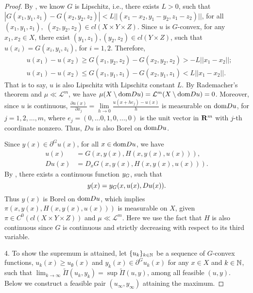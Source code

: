 \begin{proof}
	By \Gzero, we know $G$ is Lipschitz, i.e., there exists $L>0$, such that $|G(x_1, y_1, z_1)-G(x_2, y_2, z_2)|< L ||(x_1-x_2,y_1-y_2, z_1-z_2)||$, for all $(x_1,y_1,z_1),$ $(x_2, y_2, z_2) \in cl(X\times Y\times Z)$.
	Since $u$ is $G$-convex, for any $x_1, x_2 \in X$, there exist $(y_1, z_1), (y_2, z_2) \in cl( Y \times Z)$, such that $u(x_i) = G(x_i,y_i,z_i)$, for $i=1,2$. Therefore, 
	\begin{equation*}
	\begin{split}
	&u(x_1)-u(x_2) \ge G(x_1, y_2, z_2) - G(x_2, y_2, z_2) > -L ||x_1-x_2||;\\
	& 	u(x_1)-u(x_2) \le G(x_1, y_1, z_1) - G(x_2, y_1, z_1) < L ||x_1-x_2||.
	\end{split}
	\end{equation*}
	That is to say, $u$ is also Lipschitz with Lipschitz constant $L$. By Rademacher's theorem and $\mu \ll \mathcal{L}^m$, we have $\mu(X\setminus {\mathop{\rm dom}} Du) =\mathcal{L}^m(X\setminus {\mathop{\rm dom}} Du) =0$.  Moreover, since $u$ is continuous, $\frac{\partial u(x)}{\partial x_j} = \lim\limits_{h\rightarrow 0} \frac{u(x+he_j)-u(x)}{h}$ is measurable on ${\mathop{\rm dom}} Du$, for $j=1,2,..., m$, where $e_j=(0,...0, 1, 0, ...,0)$ is the unit vector in ${\mathbf R}^m$ with $j$-th coordinate nonzero. Thus, $Du$ is also Borel on ${\mathop{\rm dom}} Du$.
	
	Since $y(x) \in \partial^G u(x) $, for all $x\in {\mathop{\rm dom}} Du$, we have
	\begin{equation}\label{EqnInverse2}
	\begin{split}
		u(x) &= G(x, y(x), H(x, y(x), u(x))), \\
		Du(x) &= D_xG(x, y(x), H(x, y(x), u(x))).
	\end{split}
	\end{equation}
	By \Gone, there exists a continuous function $y_G$, such that 
	\begin{equation*}
		y(x) = y_G(x, u(x), Du(x)).
	\end{equation*} 
	Thus $y(x)$ is Borel on ${\mathop{\rm dom}} Du$, which implies $\pi(x, y(x), H(x,y(x), u(x)))$ is measurable on $X$, given $\pi \in C^0(cl(X\times Y\times Z))$ and $\mu \ll \mathcal{L}^m$. Here we use the fact that $H$ is also continuous since $G$ is continuous and strictly decreasing with respect	to its third variable.\medskip
											
											
	4. To show the supremum is attained,
	let $\{u_k\}_{k\in \mathbb{N}}$ be a sequence of %
	$G$-convex functions, $u_k(x) \ge u_{\emptyset}(x)$ and  $y_k(x) \in \partial^G u_k(x)$ for any $x\in X$ and $k \in \mathbb{N}$,  such that $\lim_{k\rightarrow \infty} \tilde{\Pi}(u_k, y_k) = \sup \tilde{\Pi}(u,y)$, among all feasible $(u,y)$. Below we construct a feasible pair $(u_{\infty}, y_{\infty})$ 
	attaining the maximum.\medskip
											

\end{proof}
